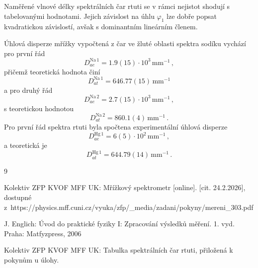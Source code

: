\documentclass{../concepts/titul_protokol_p/prepareprotokol} %
\begin{document}
Naměřené vlnové délky spektrálních čar rtuti se v rámci nejistot shodují
s tabelovanými hodnotami. Jejich závislost na úhlu $\varphi_1$ lze dobře
popsat kvadratickou závislostí, avšak s dominantním lineárním členem.

Úhlová disperze mřížky vypočtená z čar ve žluté oblasti spektra sodíku
vychází pro první řád 
\begin{equation*}
    D^\mathrm{Na\,1}_{ae} = 1.9(15)\cdot 10^3\, \mathrm{mm^{-1}} \, ,
\end{equation*}
přičemž teoretická hodnota činí
\begin{equation*}
    D^\mathrm{Na\,1}_{at} = 646.77(15)\, \mathrm{mm^{-1}}
\end{equation*}
a pro druhý řád
\begin{equation*}
    D^\mathrm{Na\,2}_{ae} = 2.7(15)\cdot 10^3\, \mathrm{mm^{-1}} \, ,
\end{equation*}
s teoretickou hodnotou
\begin{equation*}
    D^\mathrm{Na\,2}_{at} = 860.1(4)\, \mathrm{mm^{-1}} \, .
\end{equation*}
Pro první řád spektra rtuti byla spočtena experimentální úhlová disperze
\begin{equation*}
    D^\mathrm{Hg\,1}_{ae} = 6(5)\cdot 10^2\, \mathrm{mm^{-1}} \, ,
\end{equation*}
a teoretická je
\begin{equation*}
    D^\mathrm{Hg\,1}_{at} = 644.79(14)\, \mathrm{mm^{-1}} \, .
\end{equation*}

\begin{thebibliography}{9}

 Kolektiv ZFP KVOF MFF UK: Mřížkový spektrometr [online]. [cit. 24.2.2026], dostupné
z~https://physics.mff.cuni.cz/vyuka/zfp/\_media/zadani/pokyny/mereni\_303.pdf

 J. Englich: Úvod do praktické fyziky I: Zpracování výsledků měření. 1. vyd. Praha: Matfyzpress, 2006

 Kolektiv ZFP KVOF MFF UK: Tabulka spektrálních čar rtuti,
přiložená k pokynům u úlohy.


\end{thebibliography}
\end{document}
